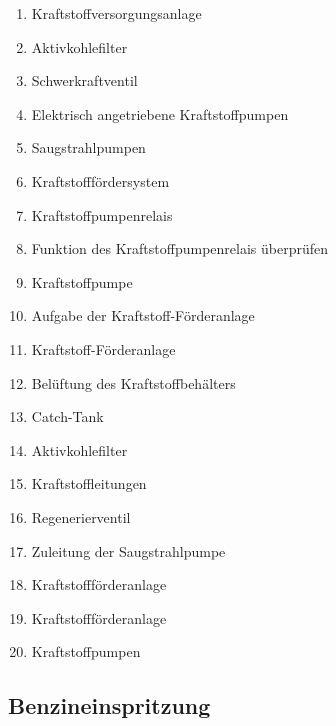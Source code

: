 \begin{enumerate}
\item
  Kraftstoffversorgungsanlage\\
\item
  Aktivkohlefilter\\
\item
  Schwerkraftventil\\
\item
  Elektrisch angetriebene Kraftstoffpumpen\\
\item
  Saugstrahlpumpen\\
\item
  Kraftstofffördersystem\\
\item
  Kraftstoffpumpenrelais\\
\item
  Funktion des Kraftstoffpumpenrelais überprüfen\\
\item
  Kraftstoffpumpe\\
\item
  Aufgabe der Kraftstoff-Förderanlage\\
\item
  Kraftstoff-Förderanlage\\
\item
  Belüftung des Kraftstoffbehälters\\
\item
  Catch-Tank\\
\item
  Aktivkohlefilter\\
\item
  Kraftstoffleitungen\\
\item
  Regenerierventil\\
\item
  Zuleitung der Saugstrahlpumpe\\
\item
  Kraftstoffförderanlage\\
\item
  Kraftstoffförderanlage\\
\item
  Kraftstoffpumpen
\end{enumerate}

\subsection{Benzineinspritzung}\label{benzineinspritzung}

